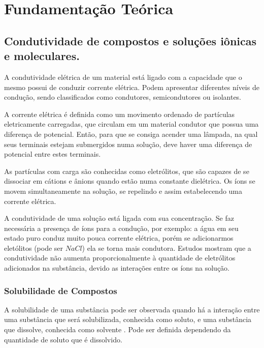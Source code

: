 \chapter{Fundamentação Teórica}


\section{Condutividade de compostos e soluções iônicas e moleculares.}\label{sub:Condutividade de compostos e soluções iônicas e moleculares.} %
A condutividade elétrica de um material está ligado com a capacidade que o mesmo possui de conduzir corrente elétrica.\cite{lab-quimica-condutividade-eletrica} Podem apresentar diferentes níveis de condução, sendo classificados como condutores, semicondutores ou isolantes.

A corrente elétrica é definida como um movimento ordenado de partículas eletricamente carregadas, que circulam em um material condutor que possua uma diferença de potencial. Então, para que se consiga acender uma lâmpada, na qual seus terminais estejam submergidos numa solução, deve haver uma diferença de potencial entre estes terminais. 

As partículas com carga são conhecidas como eletrólitos, que são capazes de se dissociar em cátions e ânions quando estão numa constante dielétrica. Os íons se movem simultaneamente na solução, se repelindo e assim estabelecendo uma corrente elétrica. \cite{brown} 

A condutividade de uma solução está ligada com sua concentração. Se faz necessária a presença de íons para a condução, por exemplo: a água em seu estado puro conduz muito pouca corrente elétrica, porém se adicionarmos eletólitos (pode ser $NaCl$) ela se torna mais condutora. Estudos mostram que a condutividade não aumenta proporcionalmente à quantidade de eletrólitos adicionados na substância, devido as interações entre os íons na solução.

\subsection{Solubilidade de Compostos}\label{sub:Condutividade de compostos e soluções iônicas e moleculares.} %

A solubilidade de uma substância pode ser observada quando há a interação entre uma substância que será solubilizada, conhecida como soluto, e uma substância que dissolve, conhecida como solvente \cite{solubilidade-substancias-organicas}. Pode ser definida dependendo da quantidade de soluto que é dissolvido. 

